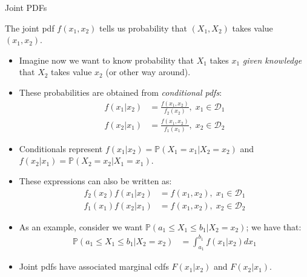 \documentclass[9pt]{beamer}
\begin{document}
%
\begin{frame}{Joint PDFs}

The joint pdf $f(x_1,x_2)$ tells us  probability that $(X_1,X_2)$ takes value $(x_1,x_2)$.

\begin{itemize}
\item Imagine now we want to know probability that $X_1$ takes $x_1$ {\em given knowledge} that $X_2$ takes value $x_2$ (or other way around). 

\item These probabilities are obtained from {\em conditional pdfs}:
\begin{align*}
f(x_1|x_2)&=\frac{f(x_1,x_2)}{f_2(x_2)},\; x_1\in \mathcal{D}_1\\
f(x_2|x_1)&=\frac{f(x_1,x_2)}{f_1(x_1)},\; x_2\in \mathcal{D}_2
\end{align*}
\item Conditionals represent $f(x_1|x_2)=\mathbb{P}(X_1=x_1|X_2=x_2)$ and $f(x_2|x_1)=\mathbb{P}(X_2=x_2|X_1=x_1)$.
\item These expressions can also be written as:
 \begin{align*}
{f_2(x_2)}f(x_1|x_2)&={f(x_1,x_2)},\; x_1\in \mathcal{D}_1\\
{f_1(x_1)}f(x_2|x_1)&={f(x_1,x_2)},\; x_2\in \mathcal{D}_2
\end{align*}
\item As an example, consider we want $\mathbb{P}(a_1\leq X_1\leq b_1|X_2=x_2)$; we have that:
\begin{align*}
\mathbb{P}(a_1\leq X_1\leq b_1|X_2=x_2)&=\int_{a_1}^{b_1}f(x_1|x_2)dx_1
\end{align*}

\item Joint pdfs have associated marginal cdfs $F(x_1|x_2)$ and $F(x_2|x_1)$. 

\end{itemize}

\end{frame}
\end{document}
